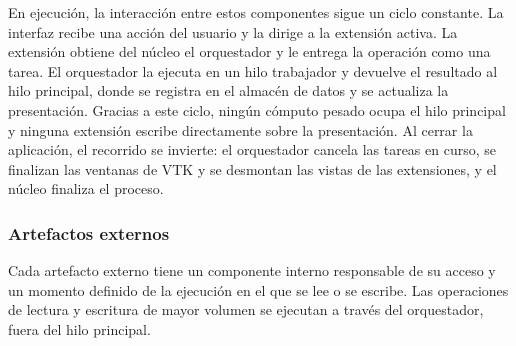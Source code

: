 \documentclass[11pt,a4paper]{article}
\DeclareRobustCommand{\_}{\textunderscore\allowbreak}
\begin{document}
En ejecución, la interacción entre estos componentes sigue un ciclo constante. La 
interfaz recibe una acción del usuario y la dirige a la extensión activa. La extensión 
obtiene del núcleo el orquestador y le entrega la operación como una tarea. El 
orquestador la ejecuta en un hilo trabajador y devuelve el resultado al hilo
principal, donde se registra en el almacén de datos y se actualiza la presentación. Gracias a este 
ciclo, ningún cómputo pesado ocupa el hilo principal y ninguna extensión escribe 
directamente sobre la presentación. Al cerrar la aplicación, el recorrido se invierte: 
el orquestador cancela las tareas en curso, se finalizan las ventanas de VTK y
se desmontan las vistas de las extensiones, y el núcleo finaliza el proceso.

\subsubsection{Artefactos externos}

Cada artefacto externo tiene un componente interno responsable de su acceso y un 
momento definido de la ejecución en el que se lee o se escribe. Las operaciones de 
lectura y escritura de mayor volumen se ejecutan a través del orquestador, fuera del 
hilo principal.
\end{document}
